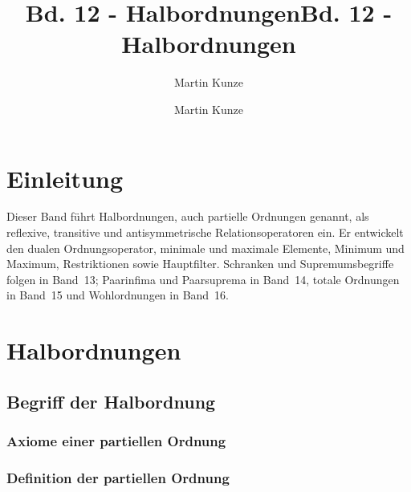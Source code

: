 \documentclass[main.tex]{subfiles}
\title{Bd. 12 - Halbordnungen}
\author{Martin Kunze}
\date{}
\begin{document}
\title{Bd. 12 - Halbordnungen}
\author{Martin Kunze}
\date{}
\hypersetup{pageanchor=false}
\maketitle
\hypersetup{pageanchor=true}
\setcounter{tocdepth}{3}
\tableofcontents
\setcounter{file}{12}
\renewcommand{\FormulaBandID}{12}
\chapter{Einleitung}

Dieser Band führt Halbordnungen, auch partielle Ordnungen genannt, als
reflexive, transitive und antisymmetrische Relationsoperatoren ein. Er
entwickelt den dualen Ordnungsoperator, minimale und maximale Elemente,
Minimum und Maximum, Restriktionen sowie Hauptfilter. Schranken und
Supremumsbegriffe folgen in Band~13; Paarinfima und Paarsuprema in Band~14,
totale Ordnungen in Band~15 und Wohlordnungen in Band~16.

\chapter{Halbordnungen}

\section{Begriff der Halbordnung}
\subsection{Axiome einer partiellen Ordnung}


\subsection{Definition der partiellen Ordnung}

\end{document}
